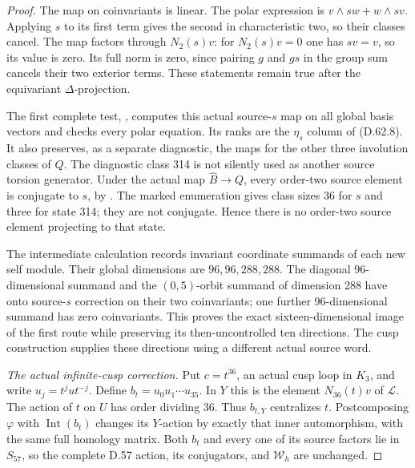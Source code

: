 \begin{proof}
The map on coinvariants is linear.
The polar expression is
\(v\wedge sw+w\wedge sv\).
Applying \(s\) to its first term
gives the second in characteristic
two, so their classes cancel.
The map factors through \(N_2(s)v\):
for \(N_2(s)v=0\) one has \(sv=v\),
so its value is zero. Its full norm
is zero, since pairing \(g\) and
\(gs\) in the group sum cancels
their two exterior terms. These
statements remain true after the
equivariant \(\Delta\)-projection.

The first complete test,
,
computes this actual source-\(s\) map
on all global basis vectors and checks
every polar equation. Its ranks are
the \(\eta_s\) column of (D.62.8).
It also preserves, as a separate
diagnostic, the maps for the other
three involution classes of \(Q\).
The diagnostic class 314 is not
silently used as another source
torsion generator. Under the actual
map \(\widehat B\to Q\), every
order-two source element is conjugate
to \(s\), by
\cite[Theorem A$'$]{A_HerfortRibes1985}.
The marked enumeration gives class
sizes 36 for \(s\) and three for
state 314; they are not conjugate.
Hence there is no order-two source
element projecting to that state.

The intermediate calculation
records invariant coordinate summands
of each new self module. Their global
dimensions are \(96,96,288,288\).
The diagonal 96-dimensional summand
and the \((0,5)\)-orbit summand of
dimension 288 have onto source-\(s\)
correction on their two coinvariants;
one further 96-dimensional summand
has zero coinvariants. This proves
the exact sixteen-dimensional image
of the first route while preserving
its then-uncontrolled ten directions.
The cusp construction supplies these
directions using a different actual
source word.

\emph{The actual infinite-cusp correction.}
Put \(c=t^{36}\), an actual cusp
loop in \(K_3\), and write
\(u_j=t^j u t^{-j}\). Define
\(b_t=u_0u_1\cdots u_{35}\).
In \(Y\) this is the element
\(N_{36}(t)v\) of \(\mathcal L\).
The action of \(t\) on \(U\)
has order dividing 36. Thus
\(b_{t,Y}\) centralizes \(t\).
Postcomposing \(\varphi\) with
\(\operatorname{Int}(b_t)\)
changes its \(Y\)-action by exactly
that inner automorphism, with the
same full homology matrix. Both
\(b_t\) and every one of its
source factors lie in \(S_{57}\),
so the complete D.57 action,
its conjugators, and \(\mathcal W_h\)
are unchanged.


\end{proof}

